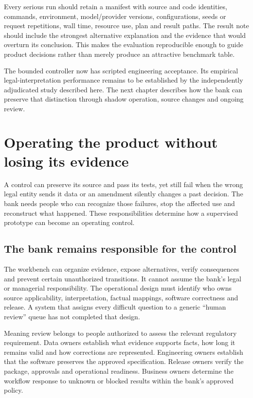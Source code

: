 \documentclass[12pt,a4paper,oneside,openany]{book}
\begin{document}
Every serious run should retain a manifest with source and code identities,
commands, environment, model/provider versions, configurations, seeds or request
repetitions, wall time, resource use, plan and result paths. The result note should
include the strongest alternative explanation and the evidence that would overturn
its conclusion. This makes the evaluation reproducible enough to guide product
decisions rather than merely produce an attractive benchmark table.

The bounded controller now has scripted engineering acceptance. Its
empirical legal-interpretation performance remains to be established by
the independently adjudicated study described here. The next chapter describes how the bank
can preserve that distinction through shadow operation, source changes and
ongoing review.

\chapter{Operating the product without losing its evidence}
\label{ch:operation}

A control can preserve its source and pass its tests, yet still fail when the
wrong legal entity sends it data or an amendment silently changes a past
decision. The bank needs people who can recognize those failures, stop the
affected use and reconstruct what happened. These responsibilities determine
how a supervised prototype can become an operating control.

\section{The bank remains responsible for the control}
\label{merge:M10:00}


The workbench can organize evidence, expose alternatives, verify consequences and
prevent certain unauthorized transitions. It cannot assume the bank's legal or
managerial responsibility. The operational design must identify who owns source
applicability, interpretation, factual mappings, software correctness and release.
A system that assigns every difficult question to a generic ``human review'' queue
has not completed that design.

Meaning review belongs to people authorized to assess the relevant regulatory
requirement. Data owners establish what evidence supports facts, how long it
remains valid and how corrections are represented. Engineering owners establish
that the software preserves the approved specification. Release owners verify the
package, approvals and operational readiness. Business owners determine the
workflow response to unknown or blocked results within the bank's approved policy.
\end{document}
